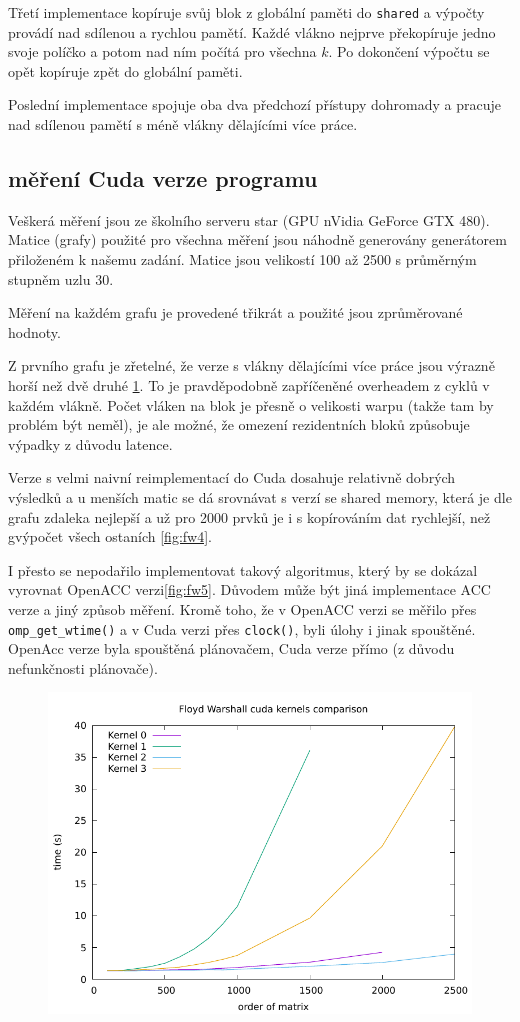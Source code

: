 \documentclass[11pt, fleqn]{article}
\begin{document}
Třetí implementace kopíruje svůj blok z globální paměti do \lstinline{shared} a výpočty provádí nad sdílenou a rychlou pamětí. Každé vlákno nejprve překopíruje jedno svoje políčko a potom nad ním počítá pro všechna $k$. Po dokončení výpočtu se opět kopíruje zpět do globální paměti.

Poslední implementace spojuje oba dva předchozí přístupy dohromady a pracuje nad sdílenou pamětí s méně vlákny dělajícími více práce.

\subsection{měření Cuda verze programu}

Veškerá měření jsou ze školního serveru star (GPU nVidia GeForce GTX 480). Matice (grafy) použité pro všechna měření jsou náhodně generovány generátorem přiloženém k našemu zadání. Matice jsou velikostí 100 až 2500 s průměrným stupněm uzlu 30.

Měření na každém grafu je provedené třikrát a použité jsou zprůměrované hodnoty.

Z prvního grafu je zřetelné, že verze s vlákny dělajícími více práce jsou výrazně horší než dvě druhé \ref{fig:fw3}. To je pravděpodobně zapříčeněné overheadem z cyklů v každém vlákně. Počet vláken na blok je přesně o velikosti warpu (takže tam by problém být neměl), je ale možné, že omezení rezidentních bloků způsobuje výpadky z důvodu latence.

Verze s velmi naivní reimplementací do Cuda dosahuje relativně dobrých výsledků a u menších matic se dá srovnávat s verzí se shared memory, která je dle grafu zdaleka nejlepší a už pro 2000 prvků je i s kopírováním dat rychlejší, než gvýpočet všech ostaních \ref{fig:fw4}. 

I přesto se nepodařilo implementovat takový algoritmus, který by se dokázal vyrovnat OpenACC verzi\ref{fig:fw5}. Důvodem může být jiná implementace ACC verze a jiný způsob měření. Kromě toho, že v OpenACC verzi se měřilo přes \lstinline{omp_get_wtime()} a v Cuda verzi přes \lstinline{clock()}, byli úlohy i jinak spouštěné. OpenAcc verze byla spouštěná plánovačem, Cuda verze přímo (z důvodu nefunkčnosti plánovače).

\begin{figure}
  \centering
  \includegraphics[width=.7\linewidth]{../results/FW_Cuda.pdf}
  \label{fig:fw3}
\end{figure}
\end{document}
